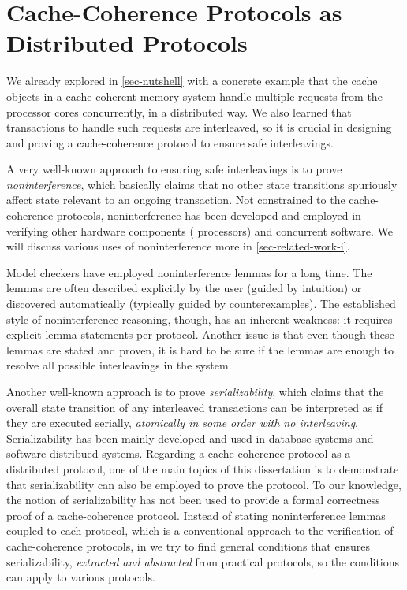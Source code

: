 \section{Cache-Coherence Protocols as Distributed Protocols}

We already explored in \autoref{sec-nutshell} with a concrete example that the cache objects in a cache-coherent memory system handle multiple requests from the processor cores concurrently, in a distributed way.
We also learned that transactions to handle such requests are interleaved, so it is crucial in designing and proving a cache-coherence protocol to ensure safe interleavings.

A very well-known approach to ensuring safe interleavings is to prove \emph{noninterference}, which basically claims that no other state transitions spuriously affect state relevant to an ongoing transaction.
Not constrained to the cache-coherence protocols, noninterference has been developed and employed in verifying other hardware components (\eg{} processors) and concurrent software.
We will discuss various uses of noninterference more in \autoref{sec-related-work-i}.

Model checkers have employed noninterference lemmas for a long time.
The lemmas are often described explicitly by the user (guided by intuition) or discovered automatically (typically guided by counterexamples).
The established style of noninterference reasoning, though, has an inherent weakness: it requires explicit lemma statements per-protocol.
Another issue is that even though these lemmas are stated and proven, it is hard to be sure if the lemmas are enough to resolve all possible interleavings in the system.

Another well-known approach is to prove \emph{serializability}, which claims that the overall state transition of any interleaved transactions can be interpreted as if they are executed serially, \ie{} \emph{atomically in some order with no interleaving}.
Serializability has been mainly developed and used in database systems and software distribued systems.
Regarding a cache-coherence protocol as a distributed protocol, one of the main topics of this dissertation is to demonstrate that serializability can also be employed to prove the protocol.
To our knowledge, the notion of serializability has not been used to provide a formal correctness proof of a cache-coherence protocol.
Instead of stating noninterference lemmas coupled to each protocol, which is a conventional approach to the verification of cache-coherence protocols, in \hemiola{} we try to find general conditions that ensures serializability, \emph{extracted and abstracted} from practical protocols, so the conditions can apply to various protocols.

